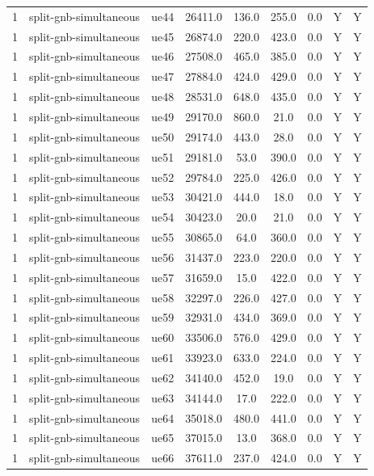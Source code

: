 \begin{table}[ht]
\begin{tabular}{|c|c|c|c|c|c|c|c|c|}
1 & split-gnb-simultaneous & ue44 & 26411.0 & 136.0 & 255.0 & 0.0 & Y & Y \\
1 & split-gnb-simultaneous & ue45 & 26874.0 & 220.0 & 423.0 & 0.0 & Y & Y \\
1 & split-gnb-simultaneous & ue46 & 27508.0 & 465.0 & 385.0 & 0.0 & Y & Y \\
1 & split-gnb-simultaneous & ue47 & 27884.0 & 424.0 & 429.0 & 0.0 & Y & Y \\
1 & split-gnb-simultaneous & ue48 & 28531.0 & 648.0 & 435.0 & 0.0 & Y & Y \\
1 & split-gnb-simultaneous & ue49 & 29170.0 & 860.0 & 21.0 & 0.0 & Y & Y \\
1 & split-gnb-simultaneous & ue50 & 29174.0 & 443.0 & 28.0 & 0.0 & Y & Y \\
1 & split-gnb-simultaneous & ue51 & 29181.0 & 53.0 & 390.0 & 0.0 & Y & Y \\
1 & split-gnb-simultaneous & ue52 & 29784.0 & 225.0 & 426.0 & 0.0 & Y & Y \\
1 & split-gnb-simultaneous & ue53 & 30421.0 & 444.0 & 18.0 & 0.0 & Y & Y \\
1 & split-gnb-simultaneous & ue54 & 30423.0 & 20.0 & 21.0 & 0.0 & Y & Y \\
1 & split-gnb-simultaneous & ue55 & 30865.0 & 64.0 & 360.0 & 0.0 & Y & Y \\
1 & split-gnb-simultaneous & ue56 & 31437.0 & 223.0 & 220.0 & 0.0 & Y & Y \\
1 & split-gnb-simultaneous & ue57 & 31659.0 & 15.0 & 422.0 & 0.0 & Y & Y \\
1 & split-gnb-simultaneous & ue58 & 32297.0 & 226.0 & 427.0 & 0.0 & Y & Y \\
1 & split-gnb-simultaneous & ue59 & 32931.0 & 434.0 & 369.0 & 0.0 & Y & Y \\
1 & split-gnb-simultaneous & ue60 & 33506.0 & 576.0 & 429.0 & 0.0 & Y & Y \\
1 & split-gnb-simultaneous & ue61 & 33923.0 & 633.0 & 224.0 & 0.0 & Y & Y \\
1 & split-gnb-simultaneous & ue62 & 34140.0 & 452.0 & 19.0 & 0.0 & Y & Y \\
1 & split-gnb-simultaneous & ue63 & 34144.0 & 17.0 & 222.0 & 0.0 & Y & Y \\
1 & split-gnb-simultaneous & ue64 & 35018.0 & 480.0 & 441.0 & 0.0 & Y & Y \\
1 & split-gnb-simultaneous & ue65 & 37015.0 & 13.0 & 368.0 & 0.0 & Y & Y \\
1 & split-gnb-simultaneous & ue66 & 37611.0 & 237.0 & 424.0 & 0.0 & Y & Y \\

\end{tabular}
\end{table}
